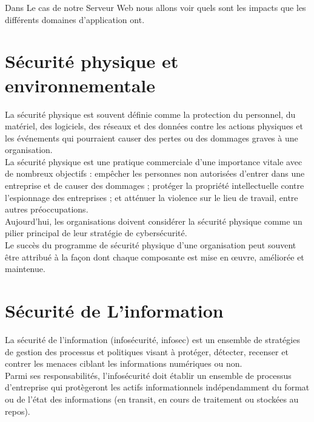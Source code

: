 Dans Le cas de notre Serveur Web nous allons voir quels sont les impacts que les différents domaines d'application ont. \\ 
\section*{Sécurité physique et environnementale }
La sécurité physique est souvent définie comme la protection du personnel, du matériel, des logiciels, des réseaux et des données contre les actions physiques et les événements qui pourraient causer des pertes ou des dommages graves à une organisation.\\
La sécurité physique est une pratique commerciale d'une importance vitale avec de nombreux objectifs : empêcher les personnes non autorisées d'entrer dans une entreprise et de causer des dommages ; protéger la propriété intellectuelle contre l'espionnage des entreprises ; et atténuer la violence sur le lieu de travail, entre autres préoccupations.\\
 Aujourd'hui, les organisations doivent considérer la sécurité physique comme un pilier principal de leur stratégie de cybersécurité.\\
 Le succès du programme de sécurité physique d'une organisation peut souvent être attribué à la façon dont chaque composante est mise en œuvre, améliorée et maintenue.\\

\section*{Sécurité de L'information} 
 La sécurité de l'information (infosécurité, infosec) est un ensemble de stratégies de gestion des processus et politiques visant à protéger, détecter, recenser et contrer les menaces ciblant les informations numériques ou non.\\
 Parmi ses responsabilités, l'infosécurité doit établir un ensemble de processus d'entreprise qui protègeront les actifs informationnels indépendamment du format ou de l'état des informations (en transit, en cours de traitement ou stockées au repos).\\
 
 

 
